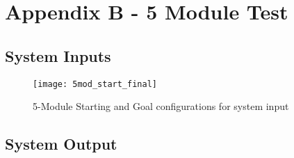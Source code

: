 \newpage
\section{Appendix B - 5 Module Test}\label{5modTest}
\subsection{System Inputs}
\begin{figure}[h]
	\centering
	\texttt{[image: 5mod\_start\_final]}
	\caption{5-Module Starting and Goal configurations for system input}
	\label{5mod_start_goal}
\end{figure}

\subsection{System Output}
\inputminted[fontsize=\footnotesize]{python}{appendices/moduleTestOutput.txt}
